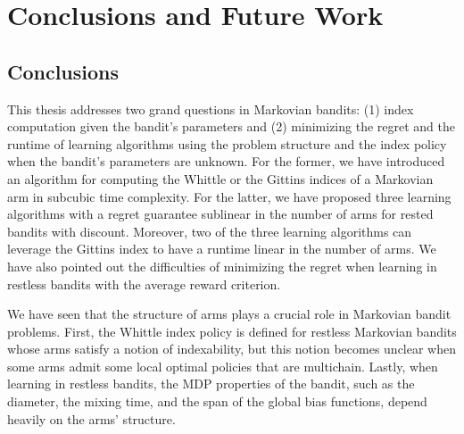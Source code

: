 \begingroup

\let\clearpage\relax

\chapter{Conclusions and Future Work}
\label{chapter:conclusion}

\section{Conclusions}

This thesis addresses two grand questions in Markovian bandits: (1) index computation given the bandit's parameters and (2) minimizing the regret and the runtime of learning algorithms using the problem structure and the index policy when the bandit's parameters are unknown.
For the former, we have introduced an algorithm for computing the Whittle or the Gittins indices of a Markovian arm in subcubic time complexity.
For the latter, we have proposed three learning algorithms with a regret guarantee sublinear in the number of arms for rested bandits with discount.
Moreover, two of the three learning algorithms can leverage the Gittins index to have a runtime linear in the number of arms.
We have also pointed out the difficulties of minimizing the regret when learning in restless bandits with the average reward criterion.

We have seen that the structure of arms plays a crucial role in Markovian bandit problems.
First, the Whittle index policy is defined for restless Markovian bandits whose arms satisfy a notion of indexability, but this notion becomes unclear when some arms admit some local optimal policies that are multichain.
Lastly, when learning in restless bandits, the MDP properties of the bandit, such as the diameter, the mixing time, and the span of the global bias functions, depend heavily on the arms' structure.

